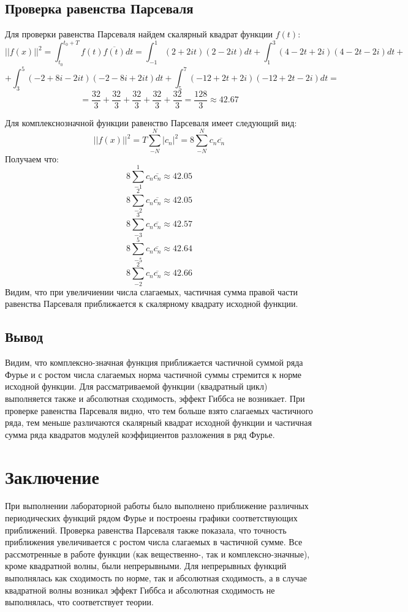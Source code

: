 \documentclass[a4paper, 12pt]{article}
\begin{document}
\subsection{Проверка равенства Парсеваля}
Для проверки равенства Парсеваля найдем скалярный квадрат функции $f(t)$:
\[
||f(x)||^2 = \int_{t_0}^{t_0 + T}f(t)\overline{f(t)}dt = \int_{-1}^{1}(2 + 2it)(2 - 2it)dt + 
\int_{1}^{3}(4 - 2t + 2i)(4 - 2t - 2i)dt + 
\]
\[
+ \int_{3}^{5}(-2 + 8i - 2it)(-2 - 8i + 2it)dt +
\int_{5}^{7}(-12 + 2t + 2i)(-12 + 2t - 2i)dt = 
\]
\[
= \frac{32}{3} + \frac{32}{3} + \frac{32}{3} + \frac{32}{3} + \frac{32}{3} = \frac{128}{3} \approx 42.67
\]

Для комплекснозначной функции равенство Парсеваля имеет следующий вид:
\[
||f(x)||^2 = T\sum_{-N}^{N}|c_n|^2 = 8\sum_{-N}^{N}c_n\overline{c_n}
\]
Получаем что:
\[
8\sum_{-1}^{1}c_n\overline{c_n} \approx 42.05
\]
\[
8\sum_{-2}^{2}c_n\overline{c_n} \approx 42.05
\]
\[
8\sum_{-3}^{3}c_n\overline{c_n} \approx 42.57
\]
\[
8\sum_{-5}^{5}c_n\overline{c_n} \approx 42.64
\]
\[
8\sum_{-2}^{2}c_n\overline{c_n} \approx 42.66
\]
Видим, что при увеличиении числа слагаемых, частичная сумма правой части равенства Парсеваля приближается к скалярному квадрату исходной функции.
\subsection{Вывод}
Видим, что комплексно-значная функция приближается частичной суммой ряда Фурье и с ростом числа слагаемых 
норма частичной суммы стремится к норме исходной функции. Для рассматриваемой функции (квадратный цикл) выполняется также и абсолютная сходимость, эффект Гиббса не возникает.
\newline
При проверке равенства Парсеваля видно, что тем больше взято слагаемых частичного ряда, тем меньше различаются скалярный квадрат исходной функции и частичная сумма ряда квадратов модулей коэффициентов разложения в ряд Фурье.
\newpage
\section{Заключение}
При выполнении лабораторной работы было выполнено приближение различных периодических функций рядом Фурье и построены графики соответствующих приближений. Проверка равенства Парсеваля также показала, что точность приближения увеличивается с ростом числа слагаемых в частичной сумме.
\newline
Все рассмотренные в работе функции (как вещественно-, так и комплексно-значные), кроме квадратной волны, были непрерывными. Для непрерывных функций выполнялась как сходимость по норме, так и абсолютная сходимость, а в случае квадратной волны возникал эффект Гиббса и абсолютная сходимость не выполнялась, что соответствует теории.
\end{document}
